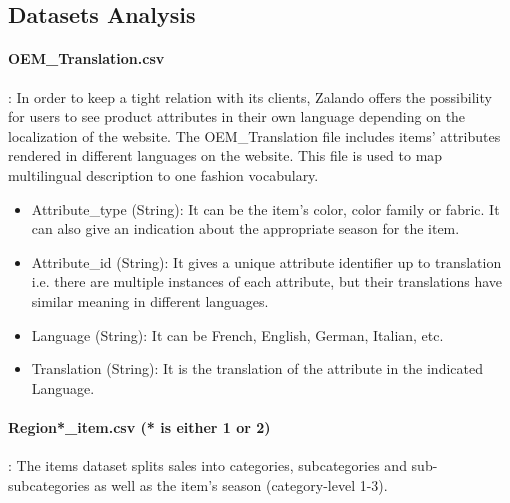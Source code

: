 \subsection{Datasets Analysis}

\paragraph*{OEM\_Translation.csv}: In order to keep a tight relation with its clients, Zalando offers the possibility for users to see product attributes in their own language depending on the localization of the website. The OEM\_Translation file includes items’ attributes rendered in different languages on the website. This file is used to map multilingual description to one fashion vocabulary.

\begin{itemize}
    \item Attribute\_type (String): It can be the item’s color, color family or fabric. It can also give an indication about the appropriate season for the item. 
    \item Attribute\_id (String): It gives a unique attribute identifier up to translation i.e. there are multiple instances of each attribute, but their translations have similar meaning in different languages. 	
    \item Language (String): It can be French, English, German, Italian, etc.
    \item Translation (String): It is the translation of the attribute in the indicated Language.
    
\end{itemize}




\paragraph*{Region*\_item.csv (* is either  1 or 2)}: The items dataset splits sales into categories, 
subcategories and sub-subcategories as well as the item’s season (category-level 1-3).

